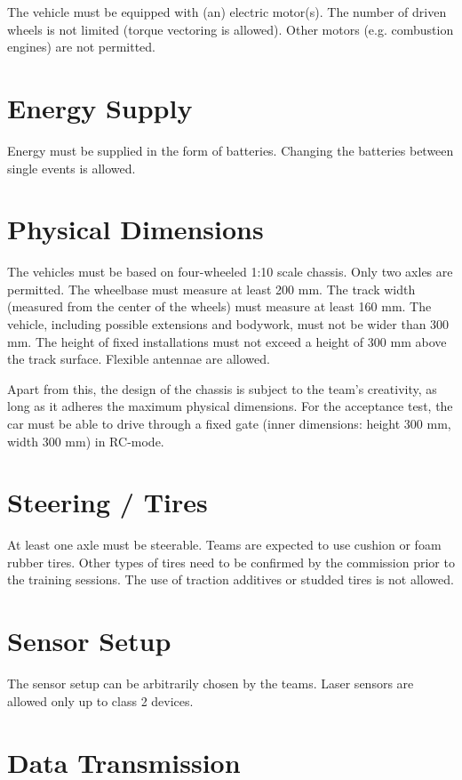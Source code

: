 \documentclass[a4paper]{report}
\begin{document}
The vehicle must be equipped with (an) electric motor(s). The number of driven
wheels is not limited (torque vectoring is allowed). Other motors (e.g.
combustion engines) are not permitted.

\section{Energy Supply}

Energy must be supplied in the form of batteries. Changing the batteries
between single events is allowed.

\section{Physical Dimensions}

The vehicles must be based on four-wheeled 1:10 scale chassis. Only two axles
are permitted. The wheelbase must measure at least 200 mm. The track width
(measured from the center of the wheels) must measure at least 160 mm. The
vehicle, including possible extensions and bodywork, must not be wider than 300
mm. The height of fixed installations must not exceed a height of 300 mm above
the track surface. Flexible antennae are allowed.

Apart from this, the design of the chassis is subject to the team’s creativity,
as long as it adheres the maximum physical dimensions. For the acceptance test,
the car must be able to drive through a fixed gate (inner dimensions: height
300 mm, width 300 mm) in RC-mode.

\section{Steering / Tires}

At least one axle must be steerable. Teams are expected to use cushion or foam
rubber tires. Other types of tires need to be confirmed by the commission prior
to the training sessions. The use of traction additives or studded tires is not
allowed.

\section{Sensor Setup}

The sensor setup can be arbitrarily chosen by the teams. Laser sensors are
allowed only up to class 2 devices.

\section{Data Transmission}
\end{document}
